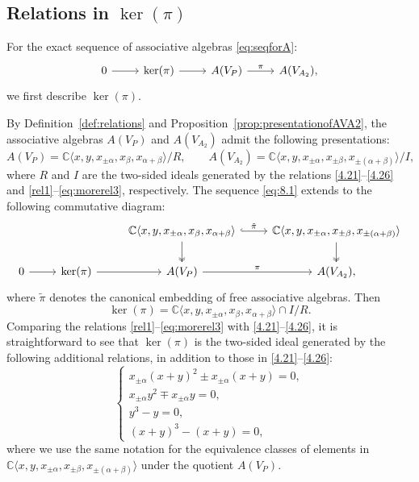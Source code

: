 \documentclass[12pt,a4paper,reqno]{amsart}
\numberwithin{equation}{section}
\numberwithin{equation}{section}
\theoremstyle{definition}
\def \C {\mathbb{C}}
\def \al{\alpha}
\def \b {\beta}
\def\<{\langle}
\def\>{\rangle}
\begin{document}
	\subsection{Relations in $\ker (\pi)$}
	For the exact sequence of associative algebras \eqref{eq:seqforA}:
	\begin{equation}\label{eq:8.1}
		\begin{tikzcd}
			0\arrow[r]& \ker(\pi)\arrow[r]& A(V_P)\arrow[r,"\pi"]& A(V_{A_2}),
		\end{tikzcd}
	\end{equation}
	we first describe $\ker(\pi)$. 
	
	By Definition~\ref{def:relations} and Proposition~\ref{prop:presentationofAVA2}, the associative algebras $A(V_P)$ and $A(V_{A_2})$ admit the following presentations:
	\[
	A(V_P)= \C\<x,y,x_{\pm \al},x_\b,x_{\al+\b}\>/R, 
	\qquad 
	A(V_{A_2})=\C\<x,y,x_{\pm \al},x_{\pm \b},x_{\pm(\al+\b)}\>/I,
	\]
	where $R$ and $I$ are the two-sided ideals generated by the relations \eqref{4.21}--\eqref{4.26} and \eqref{rel1}--\eqref{eq:morerel3}, respectively.  
	The sequence \eqref{eq:8.1} extends to the following commutative diagram:
	\[
	\begin{tikzcd}
		&& \C\<x,y,x_{\pm \al},x_\b,x_{\al+\b}\>\arrow[r,"\tilde{\pi}",hook]\arrow[d,two heads]&   
		\C\<x,y,x_{\pm \al},x_{\pm \b},x_{\pm(\al+\b)}\>\arrow[d,two heads]\\
		0\arrow[r]& \ker(\pi)\arrow[r]& A(V_P)\arrow[r,"\pi"]& A(V_{A_2}),
	\end{tikzcd}
	\]
	where $\tilde{\pi}$ denotes the canonical embedding of free associative algebras. Then
	\[
	\ker(\pi)= \C\<x,y,x_{\pm \al},x_\b,x_{\al+\b}\>\cap I/R.
	\]
	Comparing the relations \eqref{rel1}--\eqref{eq:morerel3} with \eqref{4.21}--\eqref{4.26}, it is straightforward to see that $\ker(\pi)$ is the two-sided ideal generated by the following additional relations, in addition to those in \eqref{4.21}--\eqref{4.26}:
	\begin{equation}\label{eq:extrarelations}
		\begin{cases}
			x_{\pm \al}(x+y)^2\pm x_{\pm \al}(x+y)=0,\\
			x_{\pm \al} y^2\mp x_{\pm \al} y=0,\\
			y^3-y=0,\\
			(x+y)^3-(x+y)=0,
		\end{cases}
	\end{equation}
	where we use the same notation for the equivalence classes of elements in $\C\<x,y,x_{\pm \al},x_{\pm \b},x_{\pm(\al+\b)}\>$ under the quotient $A(V_P)$.
	
\end{document}
